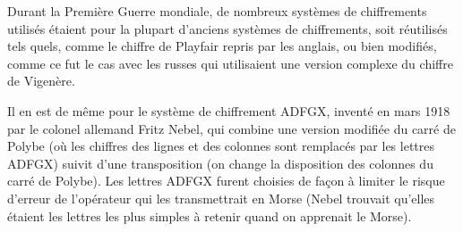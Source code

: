 
Durant la Première Guerre mondiale, de nombreux systèmes de
chiffrements utilisés étaient pour la plupart d'anciens systèmes de
chiffrements, soit réutilisés tels quels, comme le chiffre de Playfair
repris par les anglais, ou bien modifiés, comme ce fut le cas
avec les russes qui utilisaient une version complexe du chiffre de
Vigenère.

Il en est de même pour le système de chiffrement ADFGX, inventé en
mars 1918 par le colonel allemand Fritz %
Nebel, qui combine une version modifiée
du carré de Polybe (où les chiffres des
lignes et des colonnes sont remplacés par les lettres ADFGX) suivit d'une
transposition (on change la disposition
des colonnes du carré de Polybe). Les lettres ADFGX furent choisies de
façon à limiter le risque d'erreur de l'opérateur qui les
transmettrait en Morse (Nebel trouvait qu'elles étaient les lettres
les plus simples à retenir quand on apprenait le Morse).

